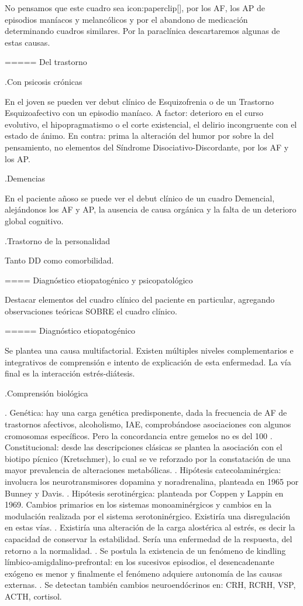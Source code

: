 \documentclass[encares.tex]{subfiles}
\begin{document}
No pensamos que este cuadro sea icon:paperclip[], por los AF, los AP de episodios maníacos y melancólicos y por el abandono de medicación determinando cuadros similares. Por la paraclínica descartaremos algunas de estas causas.

===== Del trastorno

.Con psicosis crónicas

En el joven se pueden ver debut clínico de Esquizofrenia o de un Trastorno Esquizoafectivo con un episodio maníaco. A factor: deterioro en el curso evolutivo, el hipopragmatismo o el corte existencial, el delirio incongruente con el estado de ánimo. En contra: prima la alteración del humor por sobre la del pensamiento, no elementos del Síndrome Disociativo-Discordante, por los AF y los AP.

.Demencias

En el paciente añoso se puede ver el debut clínico de un cuadro Demencial, alejándonos los AF y AP, la ausencia de causa orgánica y la falta de un deterioro global cognitivo.

.Trastorno de la personalidad

Tanto DD como comorbilidad.

==== Diagnóstico etiopatogénico y psicopatológico

Destacar elementos del cuadro clínico del paciente en particular, agregando observaciones teóricas SOBRE el cuadro clínico.

===== Diagnóstico etiopatogénico

Se plantea una causa multifactorial. Existen múltiples niveles complementarios e integrativos de comprensión e intento de explicación de esta enfermedad. La vía final es la interacción estrés-diátesis.

.Comprensión biológica

. Genética: hay una carga genética predisponente, dada la frecuencia de AF de trastornos afectivos, alcoholismo, IAE, comprobándose asociaciones con algunos cromosomas específicos. Pero la concordancia entre gemelos no es del 100%
. Constitucional: desde las descripciones clásicas se plantea la asociación con el biotipo pícnico (Kretschmer), lo cual se ve reforzado por la constatación de una mayor prevalencia de alteraciones metabólicas.
. Hipótesis catecolaminérgica: involucra los neurotransmisores dopamina y noradrenalina, planteada en 1965 por Bunney y Davis.
. Hipótesis serotinérgica: planteada por Coppen y Lappin en 1969. Cambios primarios en los sistemas monoaminérgicos y cambios en la modulación realizada por el sistema serotoninérgico. Existiría una disregulación en estas vías.
. Existiría una alteración de la carga alostérica al estrés, es decir la capacidad de conservar la estabilidad. Sería una enfermedad de la respuesta, del retorno a la normalidad.
. Se postula la existencia de un fenómeno de kindling límbico-amigdalino-prefrontal: en los sucesivos episodios, el desencadenante exógeno es menor y finalmente el fenómeno adquiere autonomía de las causas externas.
. Se detectan también cambios neuroendócrinos en: CRH, RCRH, VSP, ACTH, cortisol.
\end{document}
